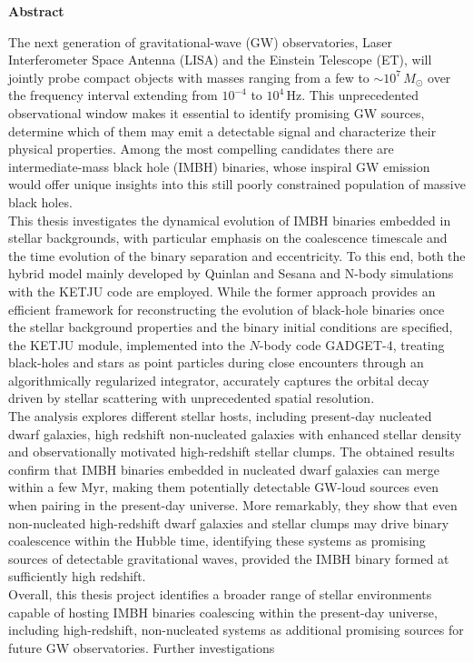 \documentclass[12pt,twoside,openany]{book}
\begin{document}












\pagestyle{empty}

\begin{center}
    {\Large\bfseries Abstract}
\end{center}

\vspace{1cm}
\noindent
The next generation of gravitational-wave (GW) observatories, Laser Interferometer Space Antenna (LISA) and the Einstein Telescope (ET), will jointly probe compact objects with masses ranging from a few to $\sim 10^7\,M_\odot$ over the frequency interval extending from $10^{-4}$ to $10^{4}\,\mathrm{Hz}$. This unprecedented observational window makes it essential to identify promising GW sources, determine which of them may emit a detectable signal and characterize their physical properties. Among the most compelling candidates there are intermediate-mass black hole (IMBH) binaries, whose inspiral GW emission would offer unique insights into this still poorly constrained population of massive black holes.\\This thesis investigates the dynamical evolution of IMBH binaries embedded in stellar backgrounds, with particular emphasis on the coalescence timescale and the time evolution of the binary separation and eccentricity. To this end, both the hybrid model mainly developed by Quinlan and Sesana and N-body simulations with the KETJU code are employed. While the former approach provides an efficient framework for reconstructing the evolution of black-hole binaries once the stellar background properties and the binary initial conditions are specified, the KETJU module, implemented into the $N$-body code GADGET-4, treating black-holes and stars as point particles during close encounters through an algorithmically regularized integrator, accurately captures the orbital decay driven by stellar scattering with unprecedented spatial resolution.\\The analysis explores different stellar hosts, including present-day nucleated dwarf galaxies, high redshift non-nucleated galaxies with enhanced stellar density and observationally motivated high-redshift stellar clumps. The obtained results confirm that IMBH binaries embedded in nucleated dwarf galaxies can merge within a few Myr, making them potentially detectable GW-loud sources even when pairing in the present-day universe. More remarkably, they show that even non-nucleated high-redshift dwarf galaxies and stellar clumps may drive binary coalescence within the Hubble time, identifying these systems as promising sources of detectable gravitational waves, provided the IMBH binary formed at sufficiently high redshift.\\Overall, this thesis project identifies a broader range of stellar environments capable of hosting IMBH binaries coalescing within the present-day universe, including high-redshift, non-nucleated systems as additional promising sources for future GW observatories. Further investigations 
\end{document}
